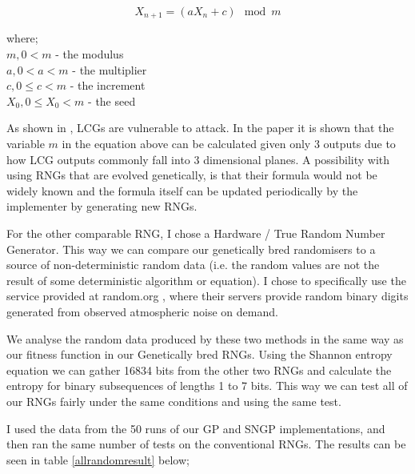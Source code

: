 \documentclass[a4paper,10.5pt]{article}
\begin{document}
\begin{center}
\noindent\begin{minipage}{.5\linewidth}
\begin{equation*}
X_{n+1} = (aX_n + c)\mod m
\end{equation*}
\end{minipage}%
\begin{minipage}{.4\linewidth}
where;\\
$m, 0 < m$ - the modulus\\
$a, 0 < a < m$ - the multiplier\\
$c, 0 \leq c < m$ - the increment\\
$X_0, 0 \leq X_0 < m$ - the seed
\end{minipage}
\end{center}

As shown in \cite{lcghack}, LCGs are vulnerable to attack. In the paper it is shown that the variable $m$ in the equation above can be calculated given only 3 outputs due to how LCG outputs commonly fall into 3 dimensional planes. A possibility with using RNGs that are evolved genetically, is that their formula would not be widely known and the formula itself can be updated periodically by the implementer by generating new RNGs.

For the other comparable RNG, I chose a Hardware / True Random Number Generator. This way we can compare our genetically bred randomisers to a source of non-deterministic random data (i.e. the random values are not the result of some deterministic algorithm or equation). I chose to specifically use the service provided at random.org \cite{randomorg}, where their servers provide random binary digits generated from observed atmospheric noise on demand. 

We analyse the random data produced by these two methods in the same way as our fitness function in our Genetically bred RNGs. Using the Shannon entropy equation we can gather 16834 bits from the other two RNGs and calculate the entropy for binary subsequences of lengths 1 to 7 bits. This way we can test all of our RNGs fairly under the same conditions and using the same test.

I used the data from the 50 runs of our GP and SNGP implementations, and then ran the same number of tests on the conventional RNGs. The results can be seen in table \ref{allrandomresult} below;
\end{document}
